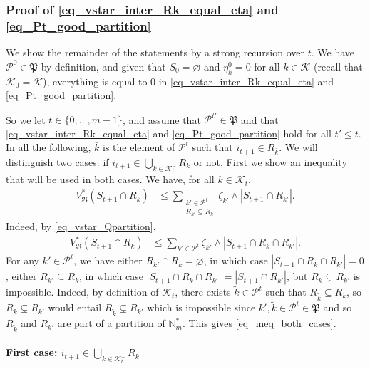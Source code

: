 \documentclass[
  11pt,
  a4paper,
]{article}
\let\oldparagraph\paragraph
\renewcommand{\paragraph}[1]{\oldparagraph{#1}\mbox{}}
\theoremstyle{plain}
\theoremstyle{plain}
\theoremstyle{plain}
\theoremstyle{definition}
\theoremstyle{definition}
\theoremstyle{remark}
\begin{document}
\subsubsection{\texorpdfstring{Proof of
\eqref{eq_vstar_inter_Rk_equal_eta} and
\eqref{eq_Pt_good_partition}}{Proof of  and }}\label{proof-of-and}

We show the remainder of the statements by a strong recursion over
\(t\). We have \(\mathcal{P}^0\in\mathfrak P\) by definition, and given
that \(S_0=\varnothing\) and \(\eta^0_k=0\) for all \(k\in\mathcal{K}\)
(recall that \(\mathcal{K}_0=\mathcal{K}\)), everything is equal to 0 in
\eqref{eq_vstar_inter_Rk_equal_eta} and \eqref{eq_Pt_good_partition}.

So we let \(t\in\{ 0,\dotsc,m-1\}\), and assume that
\(\mathcal{P}^{t'}\in\mathfrak P\) and that
\eqref{eq_vstar_inter_Rk_equal_eta} and \eqref{eq_Pt_good_partition}
hold for all \(t'\leq t\). In all the following, \(\bar k\) is the
element of \(\mathcal{P}^t\) such that \(i_{t+1}\in R_{\bar k}\). We
will distinguish two cases: if
\(i_{t+1}\in\bigcup_{k\in\mathcal{K}^-_{t}}R_k\) or not. First we show
an inequality that will be used in both cases. We have, for all
\(k\in\mathcal{K}_t\), \begin{align}
V^*_{\mathfrak{R}}(S_{t+1}\cap R_k)&\leq \sum_{\substack{k'\in\mathcal{P}^{t}\\R_{k'}\subseteq R_k}} \zeta_{k'}\wedge |S_{t+1}\cap R_{k'}|.\label{eq_ineq_both_cases}
\end{align} Indeed, by \eqref{eq_vstar_Qpartition}, \begin{align*}
V^*_{\mathfrak{R}}(S_{t+1}\cap R_k)&\leq  \sum_{k'\in\mathcal{P}^{t}} \zeta_{k'}\wedge |S_{t+1}\cap R_k \cap R_{k'}|.
\end{align*} For any \(k'\in\mathcal{P}^{t}\), we have either
\(R_{k'}\cap R_k=\varnothing\), in which case
\(|S_{t+1}\cap R_k \cap R_{k'}|=0\), either \(R_{k'}\subseteq R_k\), in
which case \(|S_{t+1}\cap R_k \cap R_{k'}|=|S_{t+1} \cap R_{k'}|\), but
\(R_{k}\subsetneq R_{k'}\) is impossible. Indeed, by definition of
\(\mathcal{K}_t\), there exists \(\tilde k\in \mathcal{P}^t\) such that
\(R_{\tilde k}\subseteq R_k\), so \(R_{k}\subsetneq R_{k'}\) would
entail \(R_{\tilde k}\subsetneq R_{k'}\) which is impossible since
\(k', \tilde k\in \mathcal{P}^t\in\mathfrak P\) and so \(R_{\tilde k}\)
and \(R_{k'}\) are part of a partition of \(\mathbb{N}_m^*\). This gives
\eqref{eq_ineq_both_cases}.

\paragraph{\texorpdfstring{First case:
\(i_{t+1}\in\bigcup_{k\in\mathcal{K}^-_{t}}R_k\)}{First case: i\_\{t+1\}\textbackslash in\textbackslash bigcup\_\{k\textbackslash in\textbackslash mathcal\{K\}\^{}-\_\{t\}\}R\_k}}\label{first-case-i_t1inbigcup_kinmathcalk-_tr_k}
\end{document}

